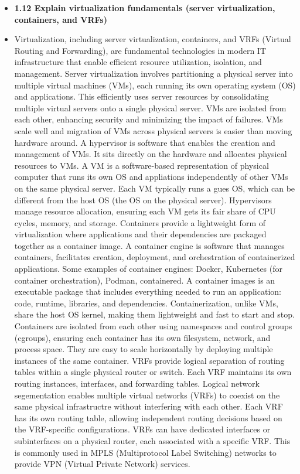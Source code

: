 \documentclass{article}
\begin{document}
\begin{itemize}
  \item \textbf{1.12 Explain virtualization fundamentals (server virtualization, containers, and VRFs)}
  	\item[] Virtualization, including server virtualization, containers, and VRFs (Virtual Routing and Forwarding), are fundamental technologies in modern IT infrastructure that enable efficient resource utilization, isolation, and management. Server virtualization involves partitioning a physical server into multiple virtual machines (VMs), each running its own operating system (OS) and applications. This efficiently uses server resources by consolidating multiple virtual servers onto a single physical server. VMs are isolated from each other, enhancing security and minimizing the impact of failures. VMs scale well and migration of VMs across physical servers is easier than moving hardware around. A hypervisor is software that enables the creation and management of VMs. It sits directly on the hardware and allocates physical resources to VMs. A VM is a software-based representation of physical computer that runs its own OS and appliations independently of other VMs on the same physical server. Each VM typically runs a gues OS, which can be different from the host OS (the OS on the physical server). Hypervisors manage resource allocation, ensuring each VM gets its fair share of CPU cycles, memory, and storage. Containers provide a lightweight form of virtualization where applications and their dependencies are packaged together as a container image. A container engine is software that manages containers, facilitates creation, deployment, and orchestration of containerized applications. Some examples of container engines: Docker, Kubernetes (for container orchestration), Podman, containered. A container images is an executable package that includes everything needed to run an application: code, runtime, libraries, and dependencies. Containerization, unlike VMs, share the host OS kernel, making them lightweight and fast to start and stop. Containers are isolated from each other using namespaces and control groups (cgroups), ensuring each container has its own filesystem, network, and process space. They are easy to scale horizontally by deploying multiple instances of the same container. VRFs provide logical separation of routing tables within a single physical router or switch. Each VRF maintains its own routing instances, interfaces, and forwarding tables. Logical network segementation enables multiple virtual networks (VRFs) to coexist on the same physical infrastructre without interfering with each other. Each VRF has its own routing table, allowing independent routing decisions based on the VRF-specific configurations. VRFs can have dedicated interfaces or subinterfaces on a physical router, each associated with a specific VRF. This is commonly used in MPLS (Multiprotocol Label Switching) networks to provide VPN (Virtual Private Network) services.


\end{itemize}
\end{document}
